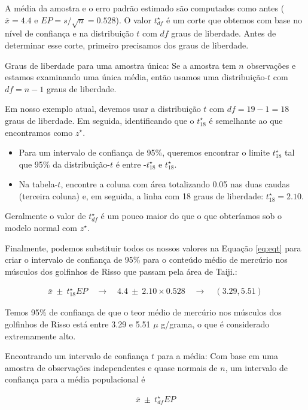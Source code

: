\documentclass[
]{book}
\theoremstyle{definition}
\theoremstyle{definition}
\theoremstyle{definition}
\theoremstyle{definition}
\theoremstyle{remark}
\begin{document}
A média da amostra e o erro padrão estimado são computados como antes (\(\bar{x} = 4.4\) e \(EP = s/\sqrt{n} = 0.528\)). O valor \(t^{\star}_{df}\) é um corte que obtemos com base no nível de confiança e na distribuição \(t\) com \(df\) graus de liberdade. Antes de determinar esse corte, primeiro precisamos dos graus de liberdade.

Graus de liberdade para uma amostra única: Se a amostra tem \(n\) observações e estamos examinando uma única média, então usamos uma distribuição-\(t\) com \(df = n-1\) graus de liberdade.

Em nosso exemplo atual, devemos usar a distribuição \(t\) com \(df = 19-1 = 18\) graus de liberdade. Em seguida, identificando que o \(t_{18}^{\star}\) é semelhante ao que encontramos como \(z^{\star}\).

\begin{itemize}
\item
  Para um intervalo de confiança de 95\%, queremos encontrar o limite \(t^{\star}_{18}\) tal que 95\% da distribuição-\(t\) é entre -\(t^{\star}_{18}\) e \(t^{\star}_{18}\).
\item
  Na tabela-\(t\), encontre a coluna com área totalizando 0.05 nas duas caudas (terceira coluna) e, em seguida, a linha com 18 graus de liberdade: \(t^{\star}_{18} = 2.10\).
\end{itemize}

Geralmente o valor de \(t^{\star}_{df}\) é um pouco maior do que o que obteríamos sob o modelo normal com \(z^{\star}\).

Finalmente, podemos substituir todos os nossos valores na Equação \eqref{eq:eqt} para criar o intervalo de confiança de 95\% para o conteúdo médio de mercúrio nos músculos dos golfinhos de Risso que passam pela área de Taiji.:

\begin{eqnarray*}
\bar{x} \ \pm\  t^{\star}_{18}EP
    \quad \to \quad
4.4 \ \pm\  2.10 \times 0.528
    \quad \to \quad
(3.29, 5.51)
\end{eqnarray*}

Temos 95\% de confiança de que o teor médio de mercúrio nos músculos dos golfinhos de Risso está entre 3.29 e 5.51 \(\mu\) g/grama, o que é considerado extremamente alto.

Encontrando um intervalo de confiança \(t\) para a média: Com base em uma amostra de observações independentes e quase normais de \(n\), um intervalo de confiança para a média populacional é

\begin{eqnarray*}
\bar{x} \ \pm\  t^{\star}_{df}EP
\end{eqnarray*}
\end{document}
